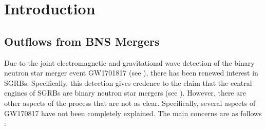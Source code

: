 \chapter{Introduction}\label{ch:introduction}

\section{Outflows from BNS Mergers}\label{sec:bns}
    Due to the joint electromagnetic and gravitational wave detection of the binary
    neutron star merger event GW1701817 (see \cite{abbott_2017}), there has
    been renewed interest in SGRBs.  Specifically, this detection gives credence to the
    claim that the central engines of SGRBs are binary neutron star mergers (see
    \cite{narayan_1992}). However, there are other aspects of the process that
    are not as clear. Specifically, several aspects of GW170817 have not been completely
    explained. The main concerns are as follows \cite{lazzati_2020}:

